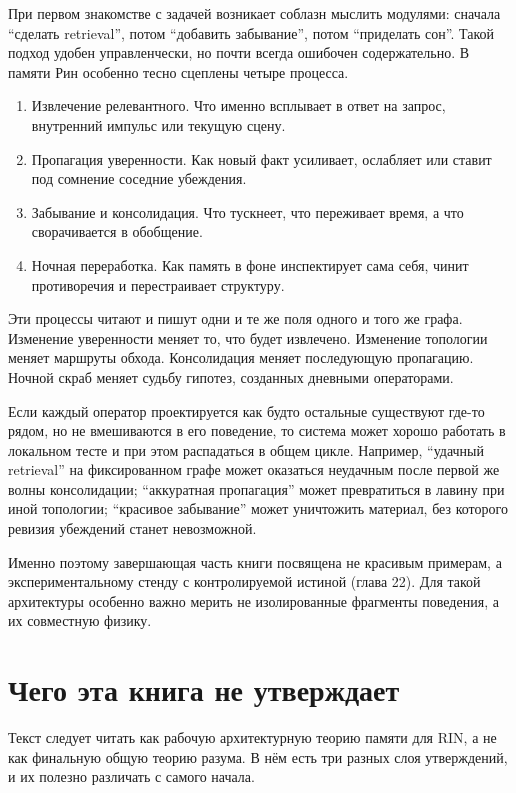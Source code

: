 При первом знакомстве с задачей возникает соблазн мыслить модулями: сначала
``сделать retrieval'', потом ``добавить забывание'', потом ``приделать сон''.
Такой подход удобен управленчески, но почти всегда ошибочен содержательно.
В памяти Рин особенно тесно сцеплены четыре процесса.

\begin{enumerate}
\item Извлечение релевантного. Что именно всплывает в ответ на запрос, внутренний импульс или текущую сцену.
\item Пропагация уверенности. Как новый факт усиливает, ослабляет или ставит под сомнение соседние убеждения.
\item Забывание и консолидация. Что тускнеет, что переживает время, а что сворачивается в обобщение.
\item Ночная переработка. Как память в фоне инспектирует сама себя, чинит противоречия и перестраивает структуру.
\end{enumerate}

Эти процессы читают и пишут одни и те же поля одного и того же графа.
Изменение уверенности меняет то, что будет извлечено. Изменение топологии
меняет маршруты обхода. Консолидация меняет последующую пропагацию. Ночной
скраб меняет судьбу гипотез, созданных дневными операторами.

\begin{pitfall}
Если каждый оператор проектируется как будто остальные существуют где-то
рядом, но не вмешиваются в его поведение, то система может хорошо работать в
локальном тесте и при этом распадаться в общем цикле. Например, ``удачный
retrieval'' на фиксированном графе может оказаться неудачным после первой же
волны консолидации; ``аккуратная пропагация'' может превратиться в лавину при
иной топологии; ``красивое забывание'' может уничтожить материал, без которого
ревизия убеждений станет невозможной.
\end{pitfall}

Именно поэтому завершающая часть книги посвящена не красивым примерам, а
экспериментальному стенду с контролируемой истиной (глава 22). Для такой
архитектуры особенно важно мерить не изолированные фрагменты поведения, а их
совместную физику.

\section{Чего эта книга не утверждает}

Текст следует читать как рабочую архитектурную теорию памяти для RIN, а не
как финальную общую теорию разума. В нём есть три разных слоя утверждений, и
их полезно различать с самого начала.

